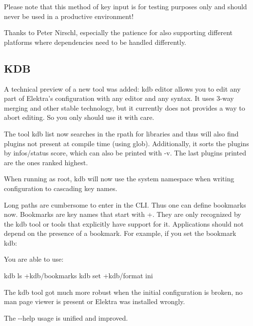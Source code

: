 Please note that this method of key input is for testing purposes only and should never be used in a productive environment!

Thanks to Peter Nirschl, especially the patience for also supporting different platforms where dependencies need to be handled differently.

\subsection*{K\+DB}

A technical preview of a new tool was added\+: {\ttfamily kdb editor} allows you to edit any part of Elektra’s configuration with any editor and any syntax. It uses 3-\/way merging and other stable technology, but it currently does not provides a way to abort editing. So you only should use it with care.

The tool {\ttfamily kdb list} now searches in the rpath for libraries and thus will also find plugins not present at compile time (using {\ttfamily glob}). Additionally, it sorts the plugins by {\ttfamily infos/status} score, which can also be printed with {\ttfamily -\/v}. The last plugins printed are the ones ranked highest.

When running as root, {\ttfamily kdb} will now use the {\ttfamily system} namespace when writing configuration to cascading key names.

Long paths are cumbersome to enter in the C\+LI. Thus one can define bookmarks now. Bookmarks are key names that start with {\ttfamily +}. They are only recognized by the {\ttfamily kdb} tool or tools that explicitly have support for it. Applications should not depend on the presence of a bookmark. For example, if you set the bookmark kdb\+: 


You are able to use\+: \begin{DoxyVerb}    kdb ls +kdb/bookmarks
    kdb set +kdb/format ini
\end{DoxyVerb}


The kdb tool got much more robust when the initial configuration is broken, no man page viewer is present or Elektra was installed wrongly.

The {\ttfamily -\/-\/help} usage is unified and improved.


